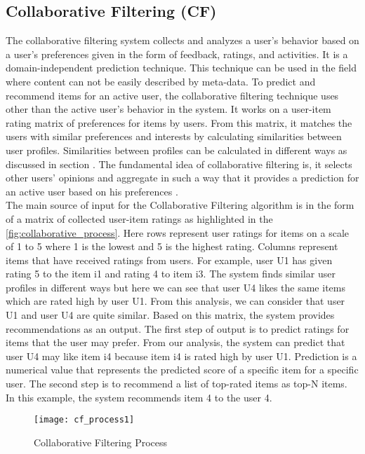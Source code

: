 \subsection{Collaborative Filtering (CF)}
The collaborative filtering system collects and analyzes a user's behavior based on a user's preferences given in the form of feedback, ratings, and activities. It is a domain-independent prediction technique. This technique can be used in the field where content can not be easily described by meta-data. To predict and recommend items for an active user, the collaborative filtering technique uses other than the active user's behavior in the system. It works on a user-item rating matrix of preferences for items by users. From this matrix, it matches the users with similar preferences and interests by calculating similarities between user profiles. Similarities between profiles can be calculated in different ways as discussed in section . The fundamental idea of collaborative filtering is, it selects other users' opinions and aggregate in such a way that it provides a prediction for an active user based on his preferences \cite{7}.\\
The main source of input for the Collaborative Filtering algorithm is in the form of a matrix of collected user-item ratings as highlighted in the \autoref{fig:collaborative_process}. Here rows represent user ratings for items on a scale of 1 to 5 where 1 is the lowest and 5 is the highest rating. Columns represent items that have received ratings from users. For example, user U1 has given rating 5 to the item i1 and rating 4 to item i3. The system finds similar user profiles in different ways but here we can see that user U4 likes the same items which are rated high by user U1. From this analysis, we can consider that user U1 and user U4 are quite similar. Based on this matrix, the system provides recommendations as an output. The first step of output is to predict ratings for items that the user may prefer. From our analysis, the system can predict that user U4 may like item i4 because item i4 is rated high by user U1. Prediction is a numerical value that represents the predicted score of a specific item for a specific user. The second step is to recommend a list of top-rated items as top-N items. In this example, the system recommends item 4 to the user 4.
\\
\begin{figure}[H]
	\centering
	\texttt{[image: cf\_process1]}
	\caption{Collaborative Filtering Process \cite{33}}
	\label{fig:collaborative_process}
\end{figure}


